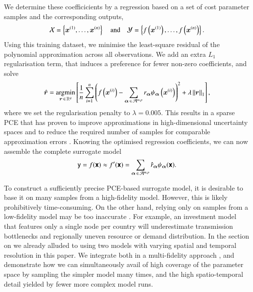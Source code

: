 We determine these coefficicients by a regression based on
a set of cost parameter samples
and the corresponding outputs,
\begin{equation}
    \mathcal{X} = \left\{ \bm x^{(1)},\dots,\bm x^{(n)} \right\} \quad\text{and}\quad
    \mathcal{Y} = \left\{ f\left(\bm x^{(1)}\right),\dots,f\left(\bm x^{(n)}\right) \right\}.
\end{equation}
Using this training dataset, we minimise the least-square residual of the polynomial approximation across all observations.
We add an extra $L_1$ regularisation term, %
that induces a preference for fewer non-zero coefficients, and solve
\begin{equation}
    \hat{\bm{r}} = \operatorname*{\arg\!\min}_{\bm{r} \,\in\, \mathbb{R}^q} \left[ \frac{1}{n} \sum_{i=1}^n \left(
        f\left(\bm x^{(i)}\right) - \sum_{{\bm{\alpha}} \,\in\, \mathcal{A}^{m,p}} r_{\bm{\alpha}} \psi_{\bm{\alpha}}\left(\bm x^{(i)}\right)
        \right)^2  + \lambda \left\lVert\bm{r}\right\rVert_1 \right],
        \label{eq:regression}
    \end{equation}
where we set the regularisation penalty to $\lambda=0.005$.
This results in a sparse PCE that has proven to
improve approximations in high-dimensional uncertainty spaces
and to reduce the required number of samples for comparable approximation errors \cite{gratiet_metamodel-based_2015}.
Knowing the optimised regression coefficients, we can now assemble the complete surrogate model
\begin{equation}
    \mathsf{y} = f(\boldsymbol{\mathsf{x}}) \approx f'(\boldsymbol{\mathsf{x}}) = \sum_{{\bm{\alpha}} \,\in\, \mathcal{A}^{m,p}} \hat{r}_{\bm{\alpha}} \psi_{\bm{\alpha}} (\boldsymbol{\mathsf{x}}).
\end{equation}



To construct a sufficiently precise PCE-based surrogate model, it is desirable
to base it on many samples from a high-fidelity model. However, this is likely
prohibitively time-consuming. On the other hand, relying only on samples from a
low-fidelity model may be too inaccurate \cite{ng_multifidelity_2012}. For
example, an investment model that features only a single node per country will
underestimate transmission bottlenecks and regionally uneven resource or demand
distribution. In the section on  we already alluded to using two models with
varying spatial and temporal resolution in this paper. We integrate both in a
multi-fidelity approach \cite{ng_multifidelity_2012,palar_multi-fidelity_2016},
and demonstrate how we can simultaneously avail of high coverage of the
parameter space by sampling the simpler model many times, and the high
spatio-temporal detail yielded by fewer more complex model runs.

